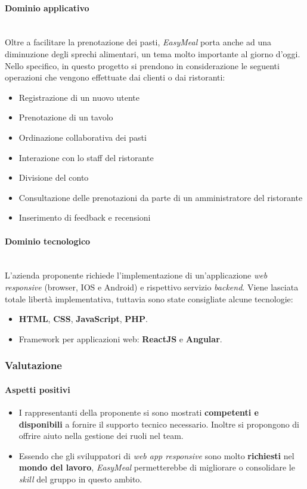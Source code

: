 \documentclass[italian,12pt]{article} %
\begin{document}
\paragraph{Dominio applicativo}\mbox{}\\
Oltre a facilitare la prenotazione dei pasti, \textit{EasyMeal} porta anche ad una diminuzione degli sprechi alimentari, un tema molto importante al giorno d'oggi. \\
Nello specifico, in questo progetto si prendono in considerazione le seguenti operazioni che vengono effettuate dai clienti o dai ristoranti:
\begin{itemize}\itemsep0em
	\item Registrazione di un nuovo utente
	\item Prenotazione di un tavolo
	\item Ordinazione collaborativa dei pasti
	\item Interazione con lo staff del ristorante
	\item Divisione del conto
	\item Consultazione delle prenotazioni da parte di un amministratore del ristorante
	\item Inserimento di feedback e recensioni
\end{itemize}
\paragraph{Dominio tecnologico}\mbox{}\\
L'azienda proponente richiede l'implementazione di un'applicazione \textit{web responsive} (browser, IOS e Android) e rispettivo servizio \textit{backend}.
Viene lasciata totale libertà implementativa, tuttavia sono state consigliate alcune tecnologie:
\begin{itemize}
	\item \textbf{HTML}, \textbf{CSS}, \textbf{JavaScript}, \textbf{PHP}.
	\item Framework per applicazioni web: \textbf{ReactJS} e \textbf{Angular}.
\end{itemize}

\subsubsection{Valutazione}
\paragraph{Aspetti positivi}
\begin{itemize}
	\item I rappresentanti della proponente si sono mostrati \textbf{competenti e disponibili} a fornire il supporto tecnico necessario.
	      Inoltre si propongono di offrire aiuto nella gestione dei ruoli nel team.
	\item Essendo che gli sviluppatori di \textit{web app responsive} sono molto \textbf{richiesti} nel \textbf{mondo del lavoro}, \textit{EasyMeal} permetterebbe
	      di migliorare o consolidare le \textit{skill} del gruppo in questo ambito.
\end{itemize}
\end{document}
